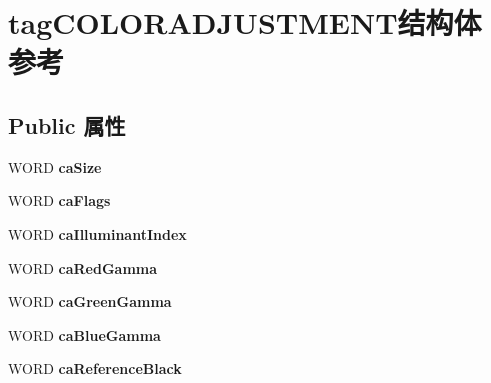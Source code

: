 \hypertarget{structtag_c_o_l_o_r_a_d_j_u_s_t_m_e_n_t}{}\section{tag\+C\+O\+L\+O\+R\+A\+D\+J\+U\+S\+T\+M\+E\+N\+T结构体 参考}
\label{structtag_c_o_l_o_r_a_d_j_u_s_t_m_e_n_t}
\subsection*{Public 属性}
\begin{DoxyCompactItemize}
\item 
\mbox{\label{structtag_c_o_l_o_r_a_d_j_u_s_t_m_e_n_t_aa8c20a69cd04203dcb7072fd226a896b}} 
W\+O\+RD {\bfseries ca\+Size}
\item 
\mbox{\label{structtag_c_o_l_o_r_a_d_j_u_s_t_m_e_n_t_a5192bc26c7fb8c50015063997cc0f58e}} 
W\+O\+RD {\bfseries ca\+Flags}
\item 
\mbox{\label{structtag_c_o_l_o_r_a_d_j_u_s_t_m_e_n_t_a702eadb5c8622720f61b3888a478d5ec}} 
W\+O\+RD {\bfseries ca\+Illuminant\+Index}
\item 
\mbox{\label{structtag_c_o_l_o_r_a_d_j_u_s_t_m_e_n_t_ae6e698791917837250562b95316bb9ee}} 
W\+O\+RD {\bfseries ca\+Red\+Gamma}
\item 
\mbox{\label{structtag_c_o_l_o_r_a_d_j_u_s_t_m_e_n_t_a2a84236268d17e8faec5d0024be3616b}} 
W\+O\+RD {\bfseries ca\+Green\+Gamma}
\item 
\mbox{\label{structtag_c_o_l_o_r_a_d_j_u_s_t_m_e_n_t_aa8e00e80aefb179a88524710a562ed5a}} 
W\+O\+RD {\bfseries ca\+Blue\+Gamma}
\item 
\mbox{\label{structtag_c_o_l_o_r_a_d_j_u_s_t_m_e_n_t_ae82e59a3ccdf73d3a923e85433be4998}} 
W\+O\+RD {\bfseries ca\+Reference\+Black}
\item 
\mbox{\label{structtag_c_o_l_o_r_a_d_j_u_s_t_m_e_n_t_a32a3fb8361d00f4eef6657d14018c407}} 

\end{DoxyCompactItemize}
